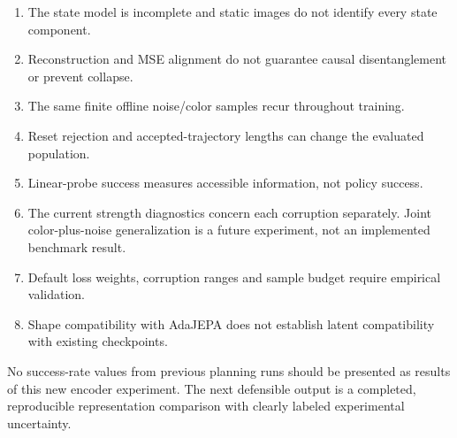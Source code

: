 \documentclass[11pt,a4paper]{article}
\begin{document}
\begin{enumerate}
\item The state model is incomplete and static images do not identify every state component.
\item Reconstruction and MSE alignment do not guarantee causal disentanglement or prevent collapse.
\item The same finite offline noise/color samples recur throughout training.
\item Reset rejection and accepted-trajectory lengths can change the evaluated population.
\item Linear-probe success measures accessible information, not policy success.
\item The current strength diagnostics concern each corruption separately. Joint color-plus-noise
generalization is a future experiment, not an implemented benchmark result.
\item Default loss weights, corruption ranges and sample budget require empirical validation.
\item Shape compatibility with AdaJEPA does not establish latent compatibility with existing checkpoints.
\end{enumerate}
No success-rate values from previous planning runs should be presented as results
of this new encoder experiment. The next defensible output is a completed, reproducible
representation comparison with clearly labeled experimental uncertainty.

\appendix
\end{document}
